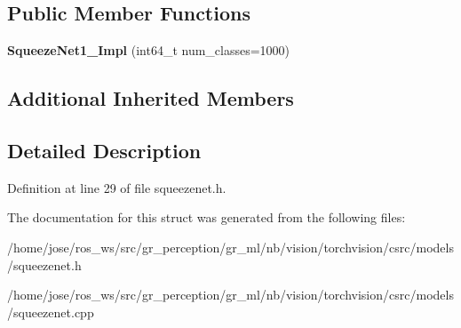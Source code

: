 \subsection*{Public Member Functions}
\begin{DoxyCompactItemize}
\item 
\mbox{\label{structvision_1_1models_1_1SqueezeNet1__1Impl_a6f318d4813b7a77f1445f5a85a08e557}} 
{\bfseries Squeeze\+Net1\+\_\+Impl} (int64\+\_\+t num\+\_\+classes=1000)
\end{DoxyCompactItemize}
\subsection*{Additional Inherited Members}


\subsection{Detailed Description}


Definition at line 29 of file squeezenet.\+h.



The documentation for this struct was generated from the following files\+:\begin{DoxyCompactItemize}
\item 
/home/jose/ros\+\_\+ws/src/gr\+\_\+perception/gr\+\_\+ml/nb/vision/torchvision/csrc/models/squeezenet.\+h\item 
/home/jose/ros\+\_\+ws/src/gr\+\_\+perception/gr\+\_\+ml/nb/vision/torchvision/csrc/models/squeezenet.\+cpp\end{DoxyCompactItemize}
